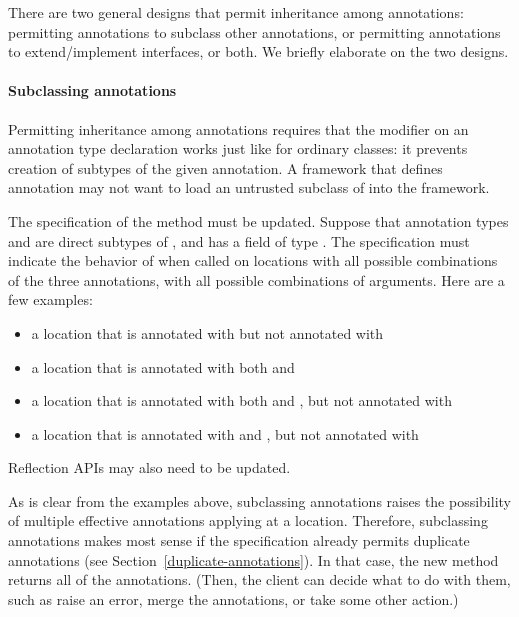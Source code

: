 \documentclass[10pt]{article}
\begin{document}
There are two general designs that permit inheritance among annotations:
permitting annotations to subclass other annotations, or permitting
annotations to extend/implement interfaces, or both.
We briefly elaborate on the two designs.

\paragraph{Subclassing annotations}

Permitting inheritance among annotations requires that the 
modifier on an annotation type declaration works just like for ordinary
classes:  it prevents creation of subtypes of the given annotation.  A
framework that defines annotation  may not want to load an
untrusted subclass  of  into the framework.

The specification of the  method must be
updated.  Suppose that annotation types  and  are
direct subtypes of , and  has a  field
of type .  The specification must indicate the behavior of
 when called on locations with all
possible combinations of the three annotations, with all possible
combinations of arguments.  Here are a few examples:

\begin{itemize}
\item
 a location that is annotated with  but not annotated with
\item
 a location that is annotated with both  and 
\item
 a location that is annotated with both  and
 , but not annotated with 
\item
 a location that is annotated with  and , but
 not annotated with 
\end{itemize}

\noindent
Reflection APIs may also need to be updated.

As is clear from the examples above,
subclassing annotations raises the possibility of multiple effective
annotations applying at a location.
Therefore, subclassing annotations makes most sense if the specification
already permits duplicate annotations (see
Section~\ref{duplicate-annotations}).
In that case,
the new  method returns all of the annotations.
(Then, the client can decide what to do with them, such as raise an
error, merge the annotations, or take some other action.)
\end{document}
